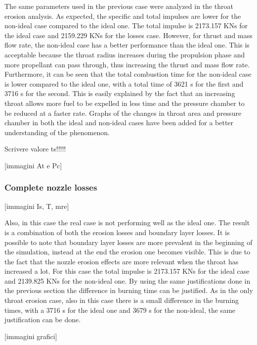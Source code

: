 The same parameters used in the previous case were analyzed in the throat erosion analysis. As expected, the specific and total impulses are lower for the non-ideal case compared to the ideal one. The total impulse is 2173.157 KNs for the ideal case and 2159.229 KNs for the losses case. However, for thrust and mass flow rate, the non-ideal case has a better performance than the ideal one. This is acceptable because the throat radius increases during the propulsion phase and more propellant can pass through, thus increasing the thrust and mass flow rate. Furthermore, it can be seen that the total combustion time for the non-ideal case is lower compared to the ideal one, with a total time of 3621 s for the first and 3716 s for the second. This is easily explained by the fact that an increasing throat allows more fuel to be expelled in less time and the pressure chamber to be reduced at a faster rate. Graphs of the changes in throat area and pressure chamber in both the ideal and non-ideal cases have been added for a better understanding of the phenomenon. 

Scrivere valore ts!!!!! 

[immagini At e Pc]

\subsubsection{Complete nozzle losses}  

[immagini Is, T, mre]   

Also, in this case the real case is not performing well as the ideal one. The result is a combination of both the erosion losses and boundary layer losses. It is possible to note that boundary layer losses are more prevalent in the beginning of the simulation, instead at the end the erosion one becomes visible. This is due to the fact that the nozzle erosion effects are more relevant when the throat has increased a lot. For this case the total impulse is 2173.157 KNs for the ideal case and 2139.825 KNs for the non-ideal one. By using the same justifications done in the previous section the difference in burning time can be justified. As in the only throat erosion case, also in this case there is a small difference in the burning times, with a 3716 s for the ideal one and 3679 s for the non-ideal, the same justification can be done. 

[immagini grafici]       
